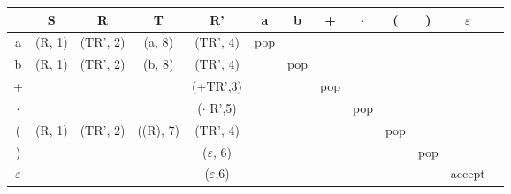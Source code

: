 
\begin{table}[H]
    \centering
    \begin{tabular}{|c|c|c|c|c|c|c|c|c|c|c|c|c|}
         \hline & S & R & T & R' & a & b & + & $\cdot$ & ( & ) & $\varepsilon$\\
         \hline a & (R, 1)  & (TR', 2)  & (a, 8) & (TR', 4)  & pop &  &  &  & & &\\
         \hline b & (R, 1)  & (TR', 2)  & (b, 8) & (TR', 4)  &  & pop &  &  & & &\\
        \hline + &  &  &  & (+TR',3) &  &  & pop &  & & &\\
        \hline $\cdot$ &  &  &  & ($\cdot$ R',5) &  &  &  & pop & & &\\
         \hline ( & (R, 1)  & (TR', 2)  & ((R), 7) & (TR', 4)  &  &  &  &  & pop & &\\
        \hline ) &  &  &  & ($\varepsilon$, 6) &  &  &  &  & & pop &\\
        \hline $\varepsilon$ &  &  &  & ($\varepsilon$,6) &  &  &  &  & & & accept \\
        \hline
    \end{tabular}
    \label{tab:my_label}
\end{table}
